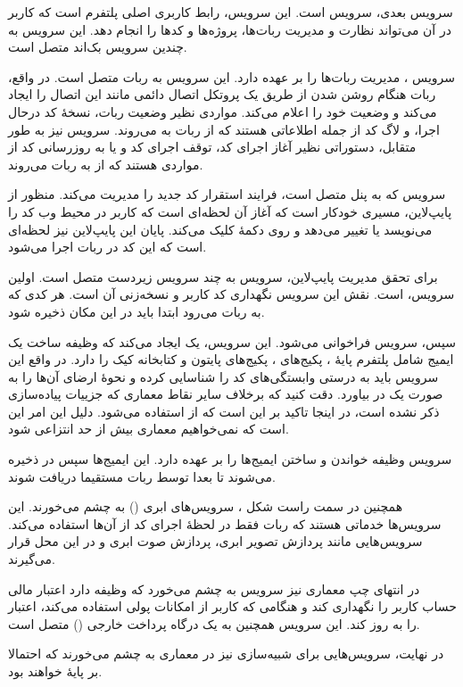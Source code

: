 \documentclass{cake-classes/short-report-fa}
\begin{document}
سرویس بعدی، سرویس  است. این سرویس، رابط کاربری اصلی پلتفرم است که کاربر در آن می‌تواند نظارت و مدیریت ربات‌ها، پروژه‌ها و کدها را انجام دهد. این سرویس به چندین سرویس بک‌اند متصل است.

سرویس ، مدیریت ربات‌ها را بر عهده دارد. این سرویس به ربات متصل است. در واقع، ربات هنگام روشن شدن از طریق یک پروتکل اتصال دائمی مانند  این اتصال را ایجاد می‌کند و وضعیت خود را اعلام می‌کند. مواردی نظیر وضعیت ربات، نسخهٔ کد درحال اجرا، و لاگ کد از جمله اطلاعاتی هستند که از ربات به  می‌روند. سرویس  نیز به طور متقابل، دستوراتی نظیر آغاز اجرای کد، توقف اجرای کد و یا به روزرسانی کد از مواردی هستند که از  به ربات می‌روند.

سرویس  که به پنل متصل است، فرایند استقرار کد جدید را مدیریت می‌کند. منظور از پایپ‌لاین، مسیری خودکار است که آغاز آن لحظه‌ای است که کاربر در محیط وب کد را می‌نویسد یا تغییر می‌دهد و روی دکمهٔ  کلیک می‌کند. پایان این پایپ‌لاین نیز لحظه‌ای است که این کد در ربات اجرا می‌شود.

برای تحقق مدیریت پایپ‌لاین، سرویس  به چند سرویس زیردست متصل است. اولین سرویس،  است. نقش این سرویس نگهداری کد کاربر و نسخه‌زنی آن است. هر کدی که به ربات می‌رود ابتدا باید در این مکان ذخیره شود.

سپس، سرویس  فراخوانی می‌شود. این سرویس، یک  ایجاد می‌کند که وظیفه ساخت یک ایمیج شامل پلتفرم پایهٔ ، پکیج‌های ، پکیج‌های پایتون و کتابخانه کیک را دارد. در واقع این سرویس باید به درستی وابستگی‌های کد را شناسایی کرده و نحوهٔ ارضای آن‌ها را به صورت یک  در بیاورد. دقت کنید که برخلاف سایر نقاط معماری که جزییات پیاده‌سازی ذکر نشده است، در اینجا تاکید بر این است که از  استفاده می‌شود. دلیل این امر این است که نمی‌خواهیم معماری بیش از حد انتزاعی شود.

سرویس  وظیفه خواندن  و ساختن ایمیج‌ها را بر عهده دارد. این ایمیج‌ها سپس در  ذخیره می‌شوند تا بعدا توسط ربات مستقیما دریافت شوند.

همچنین در سمت راست شکل ، سرویس‌های ابری () به چشم می‌خورند. این سرویس‌ها خدماتی هستند که ربات فقط در لحظهٔ اجرای کد از آن‌ها استفاده می‌کند. سرویس‌هایی مانند پردازش تصویر ابری، پردازش صوت ابری و  در این محل قرار می‌گیرند.

در انتهای چپ معماری نیز سرویس  به چشم می‌خورد که وظیفه دارد اعتبار مالی حساب کاربر را نگهداری کند و هنگامی که کاربر از امکانات پولی استفاده می‌کند، اعتبار را به روز کند. این سرویس همچنین به یک درگاه پرداخت خارجی () متصل است.

در نهایت، سرویس‌هایی برای شبیه‌سازی نیز در معماری به چشم می‌خورند که احتمالا بر پایهٔ  خواهند بود.
\end{document}

